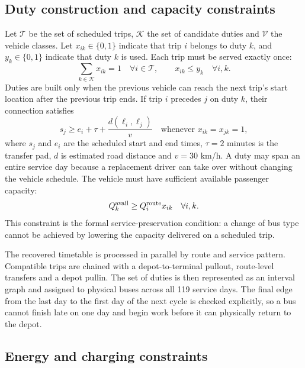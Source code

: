 \documentclass[12pt,letterpaper]{article}
\begin{document}
\subsection{Duty construction and capacity constraints}

Let $\mathcal T$ be the set of scheduled trips, $\mathcal K$ the set of candidate duties and $\mathcal V$ the vehicle classes. Let $x_{ik}\in\{0,1\}$ indicate that trip $i$ belongs to duty $k$, and $y_k\in\{0,1\}$ indicate that duty $k$ is used. Each trip must be served exactly once:
\begin{equation}
\sum_{k\in\mathcal K}x_{ik}=1\quad\forall i\in\mathcal T,\qquad
x_{ik}\le y_k\quad\forall i,k.
\end{equation}
Duties are built only when the previous vehicle can reach the next trip's start location after the previous trip ends. If trip $i$ precedes $j$ on duty $k$, their connection satisfies
\begin{equation}
s_j\ge e_i+\tau+\frac{d(\ell_i,\ell_j)}{v}
\quad\text{whenever }x_{ik}=x_{jk}=1,
\end{equation}
where $s_j$ and $e_i$ are the scheduled start and end times, $\tau=2$ minutes is the transfer pad, $d$ is estimated road distance and $v=30$ km/h. A duty may span an entire service day because a replacement driver can take over without changing the vehicle schedule. The vehicle must have sufficient available passenger capacity:
\begin{equation}
Q^{\rm avail}_{k}\ge Q^{\rm route}_{i}x_{ik}\quad\forall i,k.
\end{equation}
This constraint is the formal service-preservation condition: a change of bus type cannot be achieved by lowering the capacity delivered on a scheduled trip.

The recovered timetable is processed in parallel by route and service pattern. Compatible trips are chained with a depot-to-terminal pullout, route-level transfers and a depot pullin. The set of duties is then represented as an interval graph and assigned to physical buses across all 119 service days. The final edge from the last day to the first day of the next cycle is checked explicitly, so a bus cannot finish late on one day and begin work before it can physically return to the depot.

\subsection{Energy and charging constraints}
\end{document}
